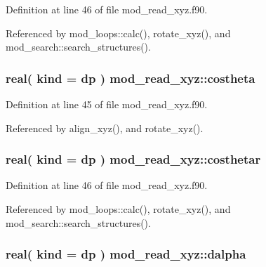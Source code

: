 Definition at line 46 of file mod\+\_\+read\+\_\+xyz.\+f90.



Referenced by mod\+\_\+loops\+::calc(), rotate\+\_\+xyz(), and mod\+\_\+search\+::search\+\_\+structures().

\subsubsection[{\texorpdfstring{costheta}{costheta}}]{\setlength{\rightskip}{0pt plus 5cm}real( kind = dp ) mod\+\_\+read\+\_\+xyz\+::costheta}\hypertarget{namespacemod__read__xyz_ae522e26e0e7e87987ca7018f36b43903}{}\label{namespacemod__read__xyz_ae522e26e0e7e87987ca7018f36b43903}


Definition at line 45 of file mod\+\_\+read\+\_\+xyz.\+f90.



Referenced by align\+\_\+xyz(), and rotate\+\_\+xyz().

\subsubsection[{\texorpdfstring{costhetar}{costhetar}}]{\setlength{\rightskip}{0pt plus 5cm}real( kind = dp ) mod\+\_\+read\+\_\+xyz\+::costhetar}\hypertarget{namespacemod__read__xyz_a4fe5cc70aa62a1a36598156d04828c90}{}\label{namespacemod__read__xyz_a4fe5cc70aa62a1a36598156d04828c90}


Definition at line 46 of file mod\+\_\+read\+\_\+xyz.\+f90.



Referenced by mod\+\_\+loops\+::calc(), rotate\+\_\+xyz(), and mod\+\_\+search\+::search\+\_\+structures().

\subsubsection[{\texorpdfstring{dalpha}{dalpha}}]{\setlength{\rightskip}{0pt plus 5cm}real( kind = dp ) mod\+\_\+read\+\_\+xyz\+::dalpha}\hypertarget{namespacemod__read__xyz_a41a3fdae2ca35a3a22c0ed3bce4ab65f}{}\label{namespacemod__read__xyz_a41a3fdae2ca35a3a22c0ed3bce4ab65f}


